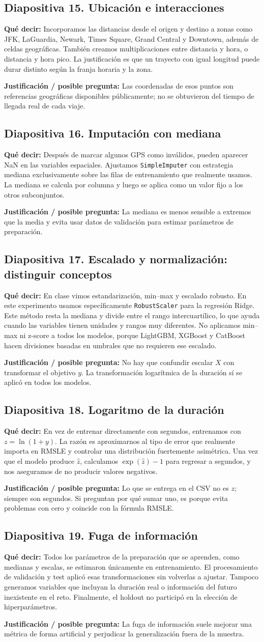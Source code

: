 \documentclass[11pt,letterpaper]{article}
\newcommand{\lamina}[2]{\subsection*{Diapositiva #1. #2}}
\newcommand{\explica}[1]{\noindent\textcolor{azul}{\textbf{Qué decir:}} #1\par\smallskip}
\newcommand{\defiende}[1]{\noindent\textcolor{verde}{\textbf{Justificación / posible pregunta:}} #1\par\medskip}
\begin{document}
\lamina{15}{Ubicación e interacciones}
\explica{Incorporamos las distancias desde el origen y destino a zonas como JFK, LaGuardia, Newark, Times Square, Grand Central y Downtown, además de celdas geográficas. También creamos multiplicaciones entre distancia y hora, o distancia y hora pico. La justificación es que un trayecto con igual longitud puede durar distinto según la franja horaria y la zona.}
\defiende{Las coordenadas de esos puntos son referencias geográficas disponibles públicamente; no se obtuvieron del tiempo de llegada real de cada viaje.}

\lamina{16}{Imputación con mediana}
\explica{Después de marcar algunos GPS como inválidos, pueden aparecer NaN en las variables espaciales. Ajustamos \texttt{SimpleImputer} con estrategia mediana exclusivamente sobre las filas de entrenamiento que realmente usamos. La mediana se calcula por columna y luego se aplica como un valor fijo a los otros subconjuntos.}
\defiende{La mediana es menos sensible a extremos que la media y evita usar datos de validación para estimar parámetros de preparación.}

\lamina{17}{Escalado y normalización: distinguir conceptos}
\explica{En clase vimos estandarización, min--max y escalado robusto. En este experimento usamos específicamente \texttt{RobustScaler} para la regresión Ridge. Este método resta la mediana y divide entre el rango intercuartílico, lo que ayuda cuando las variables tienen unidades y rangos muy diferentes. No aplicamos min--max ni z-score a todos los modelos, porque LightGBM, XGBoost y CatBoost hacen divisiones basadas en umbrales que no requieren ese escalado.}
\defiende{No hay que confundir escalar $X$ con transformar el objetivo $y$. La transformación logarítmica de la duración sí se aplicó en todos los modelos.}

\lamina{18}{Logaritmo de la duración}
\explica{En vez de entrenar directamente con segundos, entrenamos con $z=\ln(1+y)$. La razón es aproximarnos al tipo de error que realmente importa en RMSLE y controlar una distribución fuertemente asimétrica. Una vez que el modelo produce $\widehat z$, calculamos $\exp(\widehat z)-1$ para regresar a segundos, y nos aseguramos de no producir valores negativos.}
\defiende{Lo que se entrega en el CSV no es $z$; siempre son segundos. Si preguntan por qué sumar uno, es porque evita problemas con cero y coincide con la fórmula RMSLE.}

\lamina{19}{Fuga de información}
\explica{Todos los parámetros de la preparación que se aprenden, como medianas y escalas, se estimaron únicamente en entrenamiento. El procesamiento de validación y test aplicó esas transformaciones sin volverlas a ajustar. Tampoco generamos variables que incluyan la duración real o información del futuro inexistente en el reto. Finalmente, el holdout no participó en la elección de hiperparámetros.}
\defiende{La fuga de información suele mejorar una métrica de forma artificial y perjudicar la generalización fuera de la muestra.}
\end{document}
